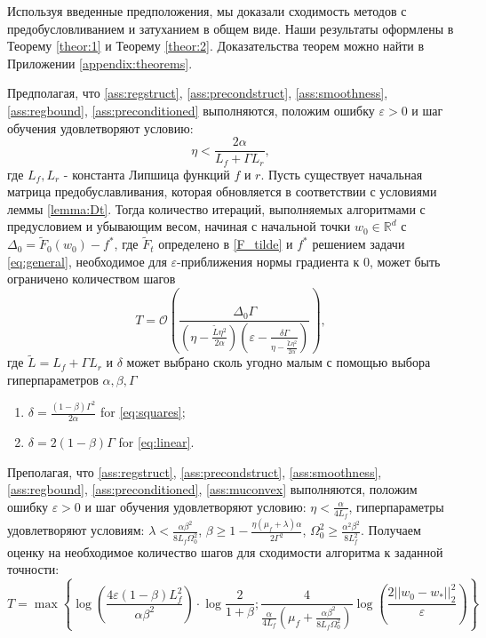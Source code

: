 Используя введенные предположения, мы доказали сходимость методов с предобусловливанием и затуханием в общем виде. Наши результаты оформлены в Теорему \ref{theor:1} и Теорему \ref{theor:2}. Доказательства теорем можно найти в Приложении \ref{appendix:theorems}.

\begin{theorem} 
    \label{theor:1}
    Предполагая, что \ref{ass:regstruct}, \ref{ass:precondstruct}, \ref{ass:smoothness}, \ref{ass:regbound}, \ref{ass:preconditioned} выполняются, положим ошибку $\varepsilon > 0$ и шаг обучения удовлетворяют условию:
    \begin{equation*}
        \eta < \frac{2 \alpha}{L_f + \Gamma L_{r}},
    \end{equation*}
    где $L_f, L_{r}$ - константа Липшица функций $f$ и $r$. 
    Пусть существует начальная матрица предобуславливания, которая обновляется в соответствии с условиями леммы \ref{lemma:Dt}.
    Тогда количество итераций, выполняемых алгоритмами с предусловием и убывающим весом, начиная с начальной точки
    $w_0 \in \mathbb{R}^d$ с $\Delta_0 = \tilde{F}_0(w_0) - f^*$, где $\widetilde{F}_t$ определено в \eqref{F_tilde} и $f^*$ решением задачи \eqref{eq:general}, 
    необходимое для $\varepsilon$-приближения нормы градиента к 0, может быть ограничено количеством шагов    
    \begin{equation*}
      T = \mathcal{O}\left( \frac{\Delta_0 \Gamma}{(\eta - \frac{\tilde{L}\eta^2}{2\alpha}) \left( \varepsilon -\frac{\delta\Gamma}{\eta - \frac{\tilde{L}\eta^2}{2\alpha}}\right)} \right),
\end{equation*}
где $\widetilde{L} = L_f + \Gamma L_{r}$ и $\delta$ может выбрано сколь угодно малым с помощью выбора гиперпараметров $\alpha, \beta, \Gamma$
\begin{enumerate}
    \item $\delta=\frac{(1 - \beta)\Gamma^2}{2\alpha}$ for \eqref{eq:squares};
    \item $\delta=2(1 - \beta)\Gamma$ for \eqref{eq:linear}.
\end{enumerate}
\end{theorem}

\begin{theorem}
\label{theor:2}
    Преполагая, что \ref{ass:regstruct}, \ref{ass:precondstruct}, \ref{ass:smoothness}, \ref{ass:regbound}, \ref{ass:preconditioned}, \ref{ass:muconvex} выполняются, положим ошибку $\varepsilon > 0$ и шаг обучения удовлетворяют условию: $\eta < \frac{\alpha}{4L_f}$, гиперпараметры удовлетворяют условиям: $\lambda < \frac{\alpha \beta^2}{8L_f \Omega_0^2}$, $\beta \geq 1 - \frac{\eta(\mu_f + \lambda)\alpha}{2 \Gamma^2}$, $\Omega_0^2 \geq \frac{\alpha^2 \beta^2}{8L_f^2}$. Получаем оценку на необходимое количество шагов для сходимости алгоритма к заданной точности:$$
T = \max \left\{ \log{\left( \frac{4 \varepsilon (1-\beta) L_f^2 }{\alpha \beta^2} \right)} \cdot \log{\frac{2}{1+\beta}} ;
\frac{4}{\frac{\alpha}{4L_f} \left(\mu_f + \frac{\alpha \beta^2}{8L_f \Omega_0^2} \right)}\log{\left(\frac{2 ||w_0-w_*||_2^2}{\varepsilon} \right)} \right\}$$
\end{theorem}

